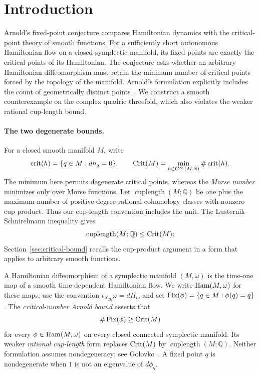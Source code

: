 \section{Introduction}\label{sec:introduction}

Arnold's fixed-point conjecture compares Hamiltonian dynamics with the
critical-point theory of smooth functions. For a sufficiently short
autonomous Hamiltonian flow on a closed symplectic manifold, its fixed points are
exactly the critical points of its Hamiltonian. The conjecture asks
whether an arbitrary Hamiltonian diffeomorphism must retain the minimum
number of critical points forced by the topology of the manifold.
Arnold's formulation explicitly includes the count of geometrically
distinct points~\cite[Section~2]{Arnold1986}. We construct a smooth
counterexample on the complex quadric threefold, which also violates the
weaker rational cup-length bound.

\paragraph{The two degenerate bounds.}
For a closed smooth manifold $M$, write
\[
 \operatorname{crit}(h)=\{q\in M:dh_q=0\},\qquad
 \operatorname{Crit}(M)=\min_{h\in C^\infty(M,\mathbb R)}\#\operatorname{crit}(h).
\]
The minimum here permits degenerate critical points, whereas the
\emph{Morse number} minimizes only over Morse functions. Let
$\operatorname{cuplength}(M;\mathbb Q)$ be one plus the maximum number
of positive-degree rational cohomology classes with nonzero cup product.
Thus our cup-length convention includes the unit. The
Lusternik--Schnirelmann inequality gives
\[
 \operatorname{cuplength}(M;\mathbb Q)\le\operatorname{Crit}(M);
\]
Section~\ref{sec:critical-bound} recalls the cup-product argument in a
form that applies to arbitrary smooth functions.

A Hamiltonian diffeomorphism of a symplectic manifold $(M,\omega)$ is
the time-one map of a smooth time-dependent Hamiltonian flow. We write
$\operatorname{Ham}(M,\omega)$ for these maps, use the convention
$\iota_{X_{H_t}}\omega=dH_t$, and set
$\operatorname{Fix}(\phi)=\{q\in M:\phi(q)=q\}$.
The \emph{critical-number Arnold bound} asserts that
\begin{equation}\label{eq:arnold-bound}
 \#\operatorname{Fix}(\phi)\ge\operatorname{Crit}(M)
\end{equation}
for every $\phi\in\operatorname{Ham}(M,\omega)$ on every closed connected symplectic
manifold. Its weaker \emph{rational cup-length} form replaces $\operatorname{Crit}(M)$
by $\operatorname{cuplength}(M;\mathbb Q)$. Neither formulation assumes
nondegeneracy; see Golovko~\cite[Conjectures~1.4 and~1.6]{Golovko2020}.
A fixed point $q$ is nondegenerate when $1$ is not an eigenvalue of
$d\phi_q$.

